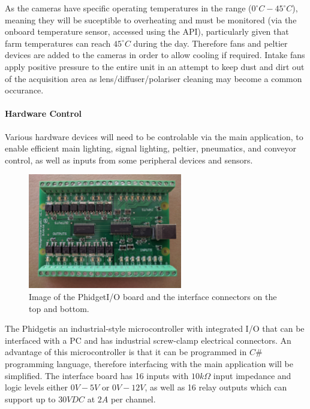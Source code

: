 \documentclass[fleqn,twoside]{article}
\begin{document}
As the cameras have specific operating temperatures in the range ($0^{\circ}C-45^{\circ}C$), meaning they will be suceptible to overheating and must be monitored (via the onboard temperature sensor, accessed using the API), particularly given that farm temperatures can reach $45^{\circ}C$ during the day. Therefore fans and peltier devices are added to the cameras in order to allow cooling if required. Intake fans apply positive pressure to the entire unit in an attempt to keep dust and dirt out of the acquisition area as lens/diffuser/polariser cleaning may become a common occurance.


\paragraph{Hardware Control}
\label{sec:phidget}

Various hardware devices will need to be controlable via the main application, to enable efficient main lighting, signal lighting, peltier, pneumatics, and conveyor control, as well as inputs from some peripheral devices and sensors.



\begin{figure}
	\begin{center}
		\includegraphics[width=0.6\textwidth]{phidget.jpg}
	\end{center}
	\caption{Image of the Phidget\texttrademark I/O board and the interface connectors on the top and bottom.}
	\label{fig:phidget}
\end{figure} 

The Phidget\texttrademark is an industrial-style microcontroller with integrated I/O that can be interfaced with a PC and has industrial screw-clamp electrical connectors. An advantage of this microcontroller is that it can be programmed in $C\#$ programming language, therefore interfacing with the main application will be simplified. The interface board has 16 inputs with $10k\Omega$ input impedance and logic levels either $0V-5V$ or $0V-12V$, as well as 16 relay outputs which can support up to $30VDC$ at $2A$ per channel. 
\end{document}
